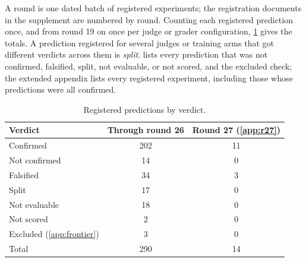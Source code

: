 A round is one dated batch of registered experiments; the registration documents in the supplement are numbered by round. Counting each registered prediction once, and from round 19 on once per judge or grader configuration, \cref{tab:ledger-totals} gives the totals. A prediction registered for several judges or training arms that got different verdicts across them is \emph{split}.  lists every prediction that was not confirmed, falsified, split, not evaluable, or not scored, and the excluded check; the extended appendix lists every registered experiment, including those whose predictions were all confirmed.

\begin{table}[htbp]
\centering
\caption{Registered predictions by verdict.}
\label{tab:ledger-totals}
\footnotesize
\begin{tabular}{lcc}
\toprule
Verdict & Through round 26 & Round 27 (\cref{app:r27}) \\
\midrule
Confirmed & 202 & 11 \\
Not confirmed & 14 & 0 \\
Falsified & 34 & 3 \\
Split & 17 & 0 \\
Not evaluable & 18 & 0 \\
Not scored & 2 & 0 \\
Excluded (\cref{app:frontier}) & 3 & 0 \\
\midrule
Total & 290 & 14 \\
\bottomrule
\end{tabular}
\end{table}

